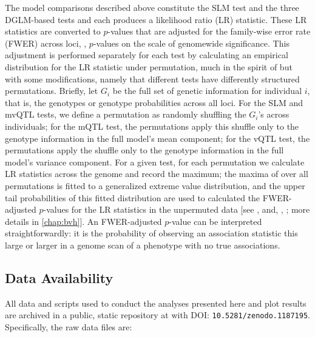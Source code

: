 The model comparisons described above constitute the SLM test and the three DGLM-based tests and each produces a likelihood ratio (LR) statistic.
These LR statistics are converted to $p$-values that are adjusted for the family-wise error rate (FWER) across loci, \ie, $p$-values on the scale of genomewide significance.
This adjustment is performed separately for each test by calculating an empirical distribution for the LR statistic under permutation, much in the spirit of \citet{Churchill1994} but with some modifications, namely that different tests have differently structured permutations.
Briefly, let $G_i$ be the full set of genetic information for individual $i$, that is, the genotypes or genotype probabilities across all loci.
For the SLM and mvQTL tests, we define a permutation as randomly shuffling the $G_i$'s across individuals; for the mQTL test, the permutations apply this shuffle only to the genotype information in the full model's mean component; for the vQTL test, the permutations apply the shuffle only to the genotype information in the full model's variance component.
For a given test, for each permutation we calculate LR statistics across the genome and record the maximum; the maxima of over all permutations is fitted to a generalized extreme value distribution, and the upper tail probabilities of this fitted distribution are used to calculated the FWER-adjusted $p$-values for the LR statistics in the unpermuted data [see \citealt{Dudbridge2004}, and, \eg, \citealt{Valdar06cc}; more details in \autoref{chap:bvh}].
An FWER-adjusted $p$-value can be interpreted straightforwardly: it is the probability of observing an association statistic this large or larger in a genome scan of a phenotype with no true associations.

\subsection{Data Availability}

    All data and scripts used to conduct the analyses presented here and plot results are archived in a public, static repository at with DOI: \texttt{10.5281/zenodo.1187195}.
    Specifically, the raw data files are:

